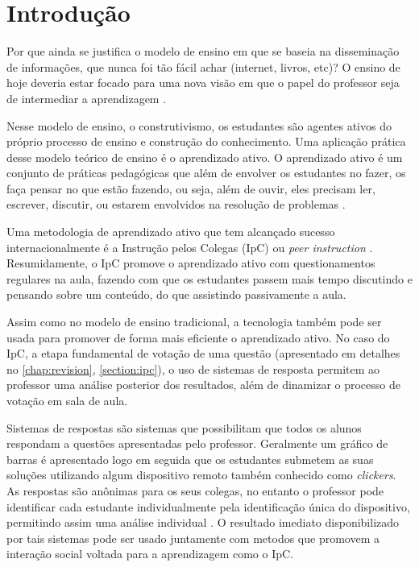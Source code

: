\chapter{Introdução}

Por que ainda se justifica o modelo de ensino em que se baseia
na disseminação de informações, que nunca foi tão fácil achar (internet,
livros, etc)? O ensino de hoje deveria estar focado para uma nova
visão em que o papel do professor seja de intermediar a aprendizagem \cite{Araujo2013}.

Nesse modelo de ensino, o construtivismo, os estudantes são agentes ativos do próprio processo
de ensino e construção do conhecimento. Uma aplicação prática desse modelo teórico de ensino é o aprendizado ativo.
O aprendizado ativo é um conjunto de práticas pedagógicas que além de envolver os estudantes no
fazer, os faça pensar no que estão fazendo, ou seja, além de ouvir, eles precisam ler,
escrever, discutir, ou estarem envolvidos na resolução de problemas \cite{Charles1991}.

Uma metodologia de aprendizado ativo que tem alcançado sucesso internacionalmente é
a Instrução pelos Colegas (IpC) ou \textit{peer instruction} \cite{Araujo2013}. Resumidamente,
o IpC promove o aprendizado ativo com questionamentos regulares na aula, fazendo com que os
estudantes passem mais tempo discutindo e pensando sobre um conteúdo, do que assistindo passivamente a aula.

Assim como no modelo de ensino tradicional, a tecnologia também pode ser usada para promover
de forma mais eficiente o aprendizado ativo. No caso do IpC, a etapa fundamental de votação de uma questão
(apresentado em detalhes no \autoref{chap:revision}, \autoref{section:ipc}),
o uso de sistemas de resposta permitem ao professor uma análise posterior dos resultados,
além de dinamizar o processo de votação em sala de aula.

Sistemas de respostas são sistemas que possibilitam que todos os alunos
respondam a questões apresentadas pelo professor. Geralmente um gráfico de barras
é apresentado logo em seguida que os estudantes submetem as suas soluções
utilizando algum dispositivo remoto também conhecido como \textit{clickers}. As respostas são anônimas para os seus colegas,
no entanto o professor pode identificar cada estudante individualmente pela
identificação única do dispositivo, permitindo assim uma análise individual \cite{Kay2009}.
O resultado imediato disponibilizado por tais sistemas pode ser usado juntamente
com metodos que promovem a interação social voltada para a aprendizagem como o IpC.

